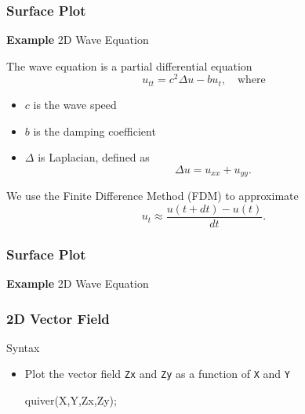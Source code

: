 \documentclass{beamer}  %
\begin{document}
\begin{frame}[fragile]
\frametitle{Surface Plot}
\textbf{Example} 2D Wave Equation

The wave equation is a partial differential equation
\begin{equation}\label{eq:wave_eq}
   u_{tt} = c^2 \Delta u - b u_t,\quad \mbox{where}
\end{equation}\pause
\begin{itemize}
    \item $c$ is the wave speed
    \item $b$ is the damping coefficient
    \item $\Delta$ is Laplacian, defined as
          \begin{equation}
          \Delta u = u_{xx} + u_{yy}.
          \end{equation}
\end{itemize}
\pause
We use the Finite Difference Method (FDM) to approximate
\begin{equation}
    u_t \approx \frac{u(t+dt) - u(t)}{dt}.
\end{equation}

\end{frame}
\begin{frame}[fragile]
\frametitle{Surface Plot}
\textbf{Example} 2D Wave Equation

\setcounter{subfigure}{0}
\begin{figure}
    \centering
\end{figure}

\end{frame}
\begin{frame}[fragile]
\frametitle{2D Vector Field}
\begin{block}{Syntax}
\begin{itemize}
    \item Plot the vector field \texttt{Zx} and \texttt{Zy} as a function of \texttt{X} and \texttt{Y}
          \begin{matlabcodebeamer}[numbers=none,frame=none]
          quiver(X,Y,Zx,Zy);
          \end{matlabcodebeamer}
\end{itemize}
\end{block}

\end{frame}
\end{document}
